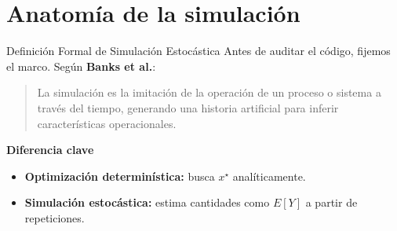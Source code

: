\documentclass[aspectratio=1610, 9pt]{beamer}
\begin{document}
\section{Anatomía de la simulación}

\begin{frame}{Definición Formal de Simulación Estocástica}
    Antes de auditar el código, fijemos el marco. Según \textbf{Banks et al.}:

    \begin{quote}
        La simulación es la imitación de la operación de un proceso o sistema a través del tiempo,
        generando una historia artificial para inferir características operacionales.
    \end{quote}

    \vspace{0.25cm}
    \textbf{Diferencia clave}
    \begin{itemize}
        \item \textbf{Optimización determinística:} busca $x^\star$ analíticamente.
        \item \textbf{Simulación estocástica:} estima cantidades como $E[Y]$ a partir de repeticiones.
    \end{itemize}
\end{frame}
\end{document}
